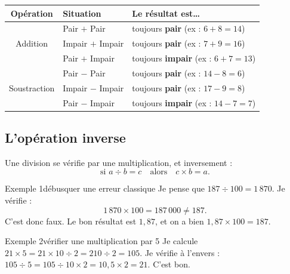 \begin{aretenir}[title={Pair ou impair ?}]
\begin{center}
\renewcommand{\arraystretch}{1.4}
\begin{tabular}{|c|l|l|}
\hline
\rowcolor{entete}
\textbf{Opération} & \textbf{Situation} & \textbf{Le résultat est\ldots} \\
\hline
\multirow{3}{*}{Addition} & Pair $+$ Pair       & toujours \textbf{pair} \quad (ex : $6 + 8 = 14$) \\ \cline{2-3}
 & Impair $+$ Impair & toujours \textbf{pair} \quad (ex : $7 + 9 = 16$) \\ \cline{2-3}
 & Pair $+$ Impair   & toujours \textbf{impair} \quad (ex : $6 + 7 = 13$) \\ \hline
\multirow{3}{*}{Soustraction} & Pair $-$ Pair   & toujours \textbf{pair} \quad (ex : $14 - 8 = 6$) \\ \cline{2-3}
 & Impair $-$ Impair & toujours \textbf{pair} \quad (ex : $17 - 9 = 8$) \\ \cline{2-3}
 & Pair $-$ Impair   & toujours \textbf{impair} \quad (ex : $14 - 7 = 7$) \\ \hline
\end{tabular}
\end{center}
\end{aretenir}

\subsection{L'opération inverse}

\begin{theorie}
Une division se vérifie par une multiplication, et inversement :
\[ \text{si } a \div b = c \quad\text{alors}\quad c \times b = a. \]
\end{theorie}

\begin{exemple}{Exemple 1}{débusquer une erreur classique}
Je pense que $187 \div 100 = 1\,870$. Je vérifie :
\[ 1\,870 \times 100 = 187\,000 \neq 187. \]
C'est donc faux. Le bon résultat est $1{,}87$, et on a bien $1{,}87 \times 100 = 187$.
\end{exemple}

\begin{exemple}{Exemple 2}{vérifier une multiplication par 5}
Je calcule $21 \times 5 = 21 \times 10 \div 2 = 210 \div 2 = 105$.
Je vérifie à l'envers : $105 \div 5 = 105 \div 10 \times 2 = 10{,}5 \times 2 = 21$. C'est bon.
\end{exemple}


